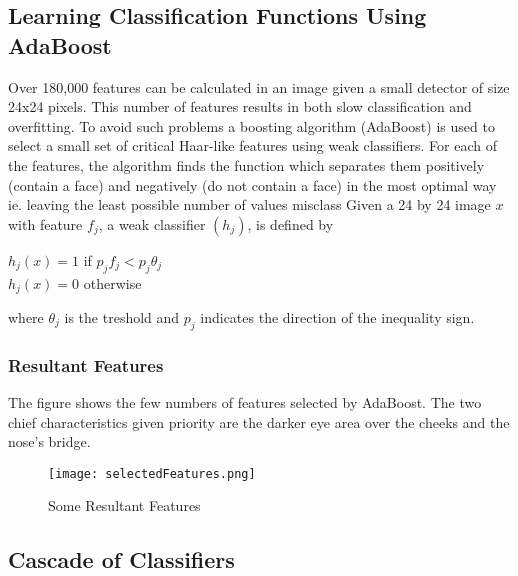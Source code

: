             \subsection{Learning Classification Functions Using AdaBoost}
            Over 180,000 features can be calculated in an image given
            a small detector of size 24x24 pixels. This number of
            features results in both slow classification and
            overfitting. To avoid such problems a boosting algorithm
            (AdaBoost) \cite{freund1999short} is used to select a
            small set of critical Haar-like features using weak
            classifiers. For each of the features, the algorithm finds
            the function which separates them positively (contain a
            face) and negatively (do not contain a face) in the most
            optimal way ie. leaving the least possible number of
            values misclass Given a 24 by 24 image \(x\) with feature
            \(f_j\), a weak classifier \((h_j)\), is defined by 
            
            \begin{center}
                \(h_j(x)=1\) if \(p_j f_j < p_j\theta_j\) \\
                \(h_j(x)=0\) otherwise
            \end{center}
            where \(\theta_j\) is the treshold and \(p_j\) indicates
            the direction of the inequality sign.
 
        \subsubsection{Resultant Features}

            The figure shows the few numbers of features selected by
            AdaBoost. The two chief characteristics given priority are the
            darker eye area over the cheeks and the nose's bridge.


                \begin{figure}[H]
                    \texttt{[image: selectedFeatures.png]}
                    \centering
                    \caption{Some Resultant Features}
                    \label{resultantFeatures}
                \end{figure}           

            \subsection{Cascade of Classifiers}

